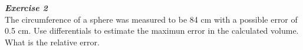 \documentclass[12px]{article}
\begin{document}
\begin{enumerate}
    \\
    \\
    \\
    \\
    \\
    \\
    \\
    \\
    \\
    \\
    \textbf{\textit{Exercise 2}}\\
    The circumference of a sphere was measured to be 84 cm with a possible error of 0.5 cm. Use differentials to estimate the maximun error in the calculated volume. What is the relative error.\\
    \\
    \\
    \\
    \\
    \\
    \\
    \\
    

\end{enumerate}
\end{document}
